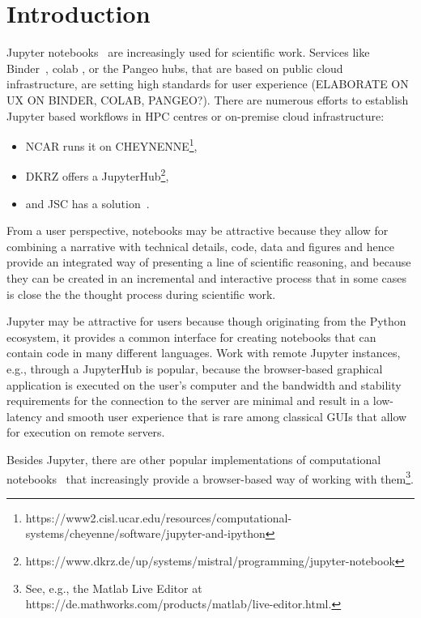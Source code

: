 
\section{Introduction}
\label{s-introductoin}

Jupyter notebooks~\citep{Kluyver2016} are increasingly used for scientific work.
Services like Binder~\citep{Jupyter2018}, colab \citep{Google2020, Carneiro2018}, or the Pangeo hubs\citep{robinson2019science}, that are based on public cloud infrastructure, are setting high standards for user experience (ELABORATE ON UX ON BINDER, COLAB, PANGEO?).
There are numerous efforts to establish Jupyter based workflows in HPC centres or on-premise cloud infrastructure:
\begin{itemize}
  \item NCAR runs it on CHEYNENNE\footnote{https://www2.cisl.ucar.edu/resources/computational-systems/cheyenne/software/jupyter-and-ipython},
  \item DKRZ offers a JupyterHub\footnote{https://www.dkrz.de/up/systems/mistral/programming/jupyter-notebook},
  \item and JSC has a solution~\citep{Goebbert2018}.
\end{itemize}

From a user perspective, notebooks may be attractive because they allow for combining a narrative with technical details, code, data and figures and hence provide an integrated way of presenting a line of scientific reasoning, and because they can be created in an incremental and interactive process that in some cases is close the the thought process during scientific work.

Jupyter may be attractive for users because though originating from the Python ecosystem, it provides a common interface for creating notebooks that can contain code in many different languages.
Work with remote Jupyter instances, e.g., through a JupyterHub is popular, because the browser-based graphical application is executed on the user's computer and the bandwidth and stability requirements for the connection to the server are minimal and result in a low-latency and smooth user experience that is rare among classical GUIs that allow for execution on remote servers.

Besides Jupyter, there are other popular implementations of computational notebooks~\citep{Hinsen2019a} that increasingly provide a browser-based way of working with them\footnote{See, e.g., the Matlab Live Editor at https://de.mathworks.com/products/matlab/live-editor.html.}.

